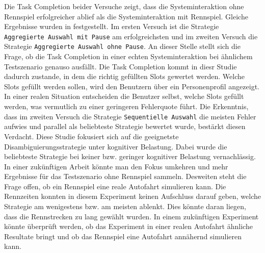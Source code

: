 \documentclass[12pt,a4paper]{scrartcl}
\begin{document}
Die Task Completion beider Versuche zeigt, dass die Systeminteraktion ohne Rennspiel erfolgreicher ablief als die Systeminteraktion mit Rennspiel. Gleiche Ergebnisse wurden in \cite{eCLDS} festgestellt. Im ersten Versuch ist die Strategie \texttt{Aggregierte Auswahl mit Pause} am erfolgreichsten und im zweiten Versuch die Strategie \texttt{Aggregierte Auswahl ohne Pause}. An dieser Stelle stellt sich die Frage, ob die Task Completion in einer echten Systeminteraktion bei ähnlichem Testszenario genauso ausfällt. Die Task Completion kommt in diesr Studie dadurch zustande, in dem die richtig gefüllten Slots gewertet werden. Welche Slots gefüllt werden sollen, wird den Benutzern über ein Personenprofil angezeigt. In einer realen Situation entscheiden die Benutzer selbst, welche Slots gefüllt werden, was vermutlich zu einer geringeren Fehlerquote führt. Die Erkenntnis, dass im zweiten Versuch die Strategie \texttt{Sequentielle Auswahl} die meisten Fehler aufwies und parallel als beliebteste Strategie bewertet wurde, bestärkt diesen Verdacht. 
\newline
\newline
Diese Studie fokusiert sich auf die geeignetste Disambiguierungsstrategie unter kognitiver Belastung. Dabei wurde die beliebteste Strategie bei keiner bzw. geringer kognitiver Belastung vernachlässig. In einer zukünftigen Arbeit könnte man den Fokus umkehren und mehr Ergebnisse für das Testszenario ohne Rennspiel sammeln. 
Desweiten steht die Frage offen, ob ein Rennspiel eine reale Autofahrt simulieren kann. Die Rennzeiten konnten in diesem Experiment keinen Aufschluss darauf geben, welche Strategie am wenigestens bzw. am meisten ablenkt. Dies könnte daran liegen, dass die Rennstrecken zu lang gewählt wurden. In einem zukünftigen Experiment könnte überprüft werden, ob das Experiment in einer realen Autofahrt ähnliche Resultate bringt und ob das Rennspiel eine Autofahrt annähernd simulieren kann.
\end{document}
